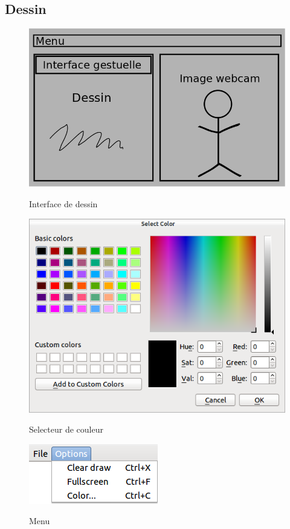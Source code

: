 \documentclass{report}
\begin{document}
			\subsection{Dessin}
				\begin{figure}[!h]
						\centering
						\includegraphics[scale=0.4]{../images/interface.png}\\
						\caption{Interface de dessin}
						\label{Interface de dessin}
				\end{figure}
				\newpage
				\begin{figure}[!h]
						\centering
						\includegraphics[scale=0.4]{../images/colorpicker.png}\\
						\caption{Selecteur de couleur}
						\label{Selecteur de couleur}
				\end{figure}
				\begin{figure}[!h]
						\centering
						\includegraphics[scale=0.4]{../images/menu.png}\\
						\caption{Menu}
						\label{Menu}
				\end{figure}
\end{document}
